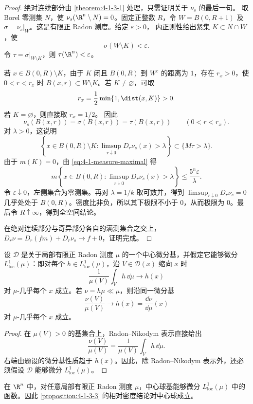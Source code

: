\begin{proof}
绝对连续部分由 \cref{theorem:4-1-3-1} 处理，只需证明关于 $\nu_s$ 的最后一句。
取 Borel 零测集 $N$，使 $\nu_s(\R^n\setminus N)=0$。固定正整数 $R$，令
$W=B(0,R+1)$ 及 $\sigma=\nu_s|_W$。这是有限正 Radon 测度。给定 $\varepsilon>0$，
内正则性给出紧集 $K\subset N\cap W$，使
\[
 \sigma(W\setminus K)<\varepsilon.
\]
令 $\tau=\sigma|_{W\setminus K}$，则 $\tau(\R^n)<\varepsilon$。

若 $x\in B(0,R)\setminus K$，由于 $K$ 闭且 $B(0,R)$ 到 $W^c$ 的距离为 $1$，存在
$r_x>0$，使 $0<r<r_x$ 时 $B(x,r)\subset W\setminus K$。若 $K\ne\varnothing$，可取
\[
 r_x=\frac12\min\{1,\dist(x,K)\}>0.
\]
若 $K=\varnothing$，则直接取 $r_x=1/2$。
因此
\[
 \nu_s(B(x,r))=\sigma(B(x,r))=\tau(B(x,r))
 \qquad(0<r<r_x).
\]
对 $\lambda>0$，这说明
\[
 \left\{x\in B(0,R)\setminus K:
   \limsup_{r\downarrow0}D_r\nu_s(x)>\lambda\right\}
 \subset\{M\tau>\lambda\}.
\]
由于 $m(K)=0$，由 \eqref{eq:4-1-measure-maximal} 得
\[
 m\left\{x\in B(0,R):
   \limsup_{r\downarrow0}D_r\nu_s(x)>\lambda\right\}
 \le\frac{5^n\varepsilon}{\lambda}.
\]
令 $\varepsilon\downarrow0$，左侧集合为零测集。再对 $\lambda=1/k$ 取可数并，得到
$\limsup_{r\downarrow0}D_r\nu_s=0$ 几乎处处于 $B(0,R)$。密度比非负，所以其下极限不小于
$0$，从而极限为 $0$。最后令 $R\uparrow\infty$，得到全空间结论。

在绝对连续部分与奇异部分各自的满测集合之交上，
$D_r\nu=D_r(fm)+D_r\nu_s\to f+0$，证明完成。
\end{proof}

\begin{proposition}\label{proposition:4-1-3-3}
设 $\mathcal D$ 是关于局部有限正 Radon 测度 $\mu$ 的一个中心微分基，并假定它能够微分
$L^1_{\mathrm{loc}}(\mu)$：即对每个 $h\in L^1_{\mathrm{loc}}(\mu)$，沿 $V\in\mathcal D(x)$
缩向 $x$ 时
\[
 \frac1{\mu(V)}\int_Vh\,\dd\mu\longrightarrow h(x)
\]
对 $\mu$-几乎每个 $x$ 成立。若 $\nu=h\mu\ll\mu$，则沿同一微分基
\[
 \frac{\nu(V)}{\mu(V)}\longrightarrow h(x)
 =\frac{\dd\nu}{\dd\mu}(x)
\]
对 $\mu$-几乎每个 $x$ 成立。
\end{proposition}

\begin{proof}
在 $\mu(V)>0$ 的基集合上，Radon--Nikodym 表示直接给出
\[
 \frac{\nu(V)}{\mu(V)}
 =\frac1{\mu(V)}\int_Vh\,\dd\mu.
\]
右端由题设的微分基性质趋于 $h(x)$。因此，除 Radon--Nikodym 表示外，还必须假设
$\mathcal D$ 能够微分 $L^1_{\mathrm{loc}}(\mu)$。
\end{proof}

\begin{remark}\label{proposition:4-1-3-4}
在 $\R^n$ 中，对任意局部有限正 Radon 测度 $\mu$，中心球基能够微分
$L^1_{\mathrm{loc}}(\mu)$ 中的函数。因此 \cref{proposition:4-1-3-3} 的相对密度结论对中心球成立。
\end{remark}

